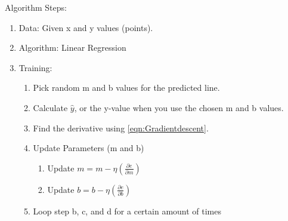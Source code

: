 \documentclass{article}
\begin{document}
Algorithm Steps:
\begin{enumerate}
    \item Data: Given x and y values (points).
    \item Algorithm: Linear Regression
    \item Training: 
        \begin{enumerate}
            \item Pick random m and b values for the predicted line.
            \item Calculate $\hat{y}$, or the y-value when you use the chosen m and b values.
            \item Find the derivative using \ref{eqn:Gradientdescent}.
            \item Update Parameters (m and b)
                \begin{enumerate}
                    \item Update $m = m - \eta(\frac{\partial e}{\partial m})$
                     \item Update $b = b - \eta(\frac{\partial e}{\partial b})$
                \end{enumerate}
            \item Loop step b, c, and d for a certain amount of times
                
            
        \end{enumerate}
\end{enumerate}


\end{document}
